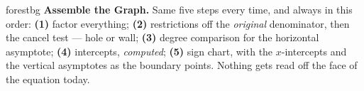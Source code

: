 \documentclass[10pt]{article}
\begin{document}
\namepartnerperiod

\vspace{0.08in}

\begin{headlinebox}{forestbg}
\small\textbf{Assemble the Graph.} Same five steps every time, and always in this order:
\textbf{(1)} factor everything; \textbf{(2)} restrictions off the \emph{original} denominator, then the
cancel test --- hole or wall; \textbf{(3)} degree comparison for the horizontal asymptote;
\textbf{(4)} intercepts, \emph{computed}; \textbf{(5)} sign chart, with the $x$-intercepts and the
vertical asymptotes as the boundary points. Nothing gets read off the face of the equation today.
\end{headlinebox}

\vspace{0.06in}
\end{document}
